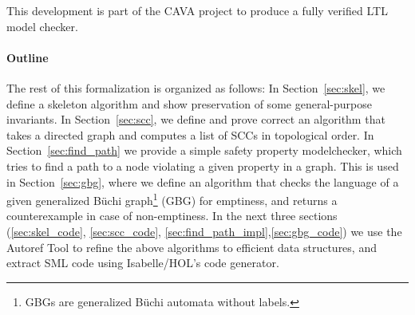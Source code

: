 This development is part of the CAVA project\cite{elnn13} to produce a fully verified LTL model checker.
    
\paragraph{Outline}
The rest of this formalization is organized as follows: 
In Section~\ref{sec:skel}, we define a skeleton algorithm and show preservation
of some general-purpose invariants. In Section~\ref{sec:scc}, we define 
and prove correct an algorithm that takes a directed graph and computes a list
of SCCs in topological order. In Section~\ref{sec:find_path} we provide a simple 
safety property modelchecker, which tries to find a path to a node violating a
given property in a graph. This is used in Section~\ref{sec:gbg}, where we
define an algorithm that checks the language of a given generalized B\"uchi 
graph\footnote{GBGs are generalized B\"uchi automata without labels.} (GBG)
for emptiness, and returns a counterexample in case of non-emptiness.
In the next three sections 
(\ref{sec:skel_code}, \ref{sec:scc_code}, \ref{sec:find_path_impl},\ref{sec:gbg_code}) we use 
the Autoref Tool\cite{La13} to refine the above algorithms to efficient 
data structures, and extract SML code using Isabelle/HOL's code 
generator\cite{Haft09,HaNi10}.
